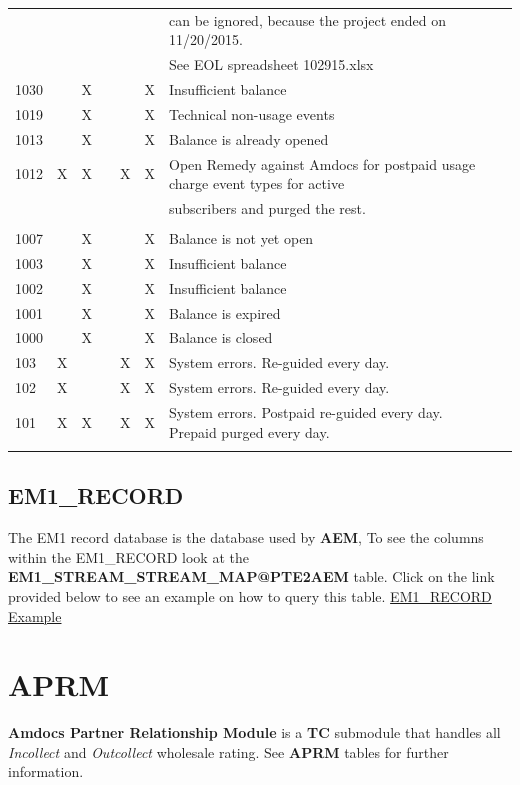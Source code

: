\documentclass[12pt,twoside]{article}
\begin{document}
\begin{landscape}
\begin{longtable}{l|l|l|l|l|l|l|l|l}
 &  &  &  &  &  & can be ignored, because the project ended on 11/20/2015.\\
 &  &  &  &  &  & See   EOL spreadsheet 102915.xlsx\\
1030 &  & X &  &  & X & Insufficient balance\\
1019 &  & X &  &  & X & Technical non-usage events\\
1013 &  & X &  &  & X & Balance is already opened\\
1012 & X & X &  & X & X & Open Remedy against Amdocs for postpaid usage charge event types for active\\
 &  &  &  &  &  & subscribers and purged the rest.\\
 &  &  &  &  &  & \\
1007 &  & X &  &  & X & Balance is not yet open\\
1003 &  & X &  &  & X & Insufficient balance\\
1002 &  & X &  &  & X & Insufficient balance\\
1001 &  & X &  &  & X & Balance is expired\\
1000 &  & X &  &  & X & Balance is closed\\
103 & X &  &  & X & X & System errors. Re-guided every day.\\
102 & X &  &  & X & X & System errors. Re-guided every day.\\
101 & X & X &  & X & X & System errors. Postpaid re-guided every day.  Prepaid purged every day.\\
 &  &  &  &  &  & \\
\hline
\end{longtable}
\normalsize

\subsection{EM1\_RECORD}
\label{sec:orgheadline69}
The EM1 record database is the database used by \textbf{AEM}, To see the columns within the EM1\_RECORD look at the \textbf{EM1\_STREAM\_STREAM\_MAP@PTE2AEM} table.
Click on the link provided below to see an example on how to query this table.
     \href{file:///home/dbalchen/workspace/CommonPlace/docs/em1_example.sql}{EM1\_RECORD Example}

\end{landscape} 
\newpage
\section{APRM}
\label{sec:orgheadline79}
\textbf{Amdocs Partner Relationship Module} is a \textbf{TC} submodule that handles all \emph{Incollect} and \emph{Outcollect} wholesale rating. See \textbf{APRM} tables for further information.
\end{document}
